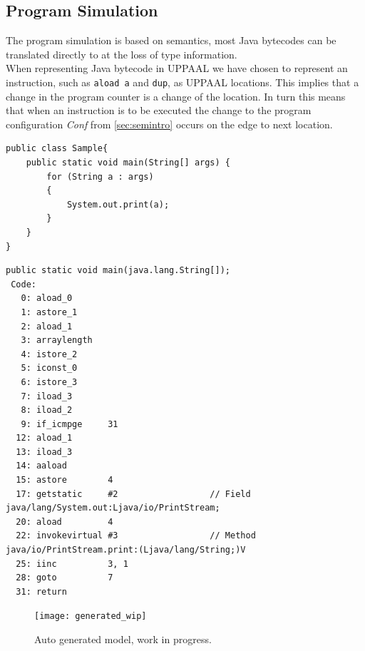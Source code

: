 \subsection{Program Simulation}
The program simulation is based on \jcl semantics, most Java bytecodes can be translated directly to \jcl at the loss of type information.\\
When representing Java bytecode in UPPAAL we have chosen to represent an instruction, such as \texttt{aload a} and \texttt{dup}, as UPPAAL locations. 
This implies that a change in the program counter is a change of the location. 
In turn this means that when an instruction is to be executed the change to the program configuration \textit{Conf} from  \cref{sec:semintro} occurs on the edge to next location.

\begin{lstlisting}[caption=Java code sample.]
public class Sample{
    public static void main(String[] args) {
        for (String a : args)         
        {
            System.out.print(a);
        }
    }
}
\end{lstlisting}

\begin{lstlisting}[caption=Bytecode sample.]
public static void main(java.lang.String[]);
 Code:
   0: aload_0       
   1: astore_1      
   2: aload_1       
   3: arraylength   
   4: istore_2      
   5: iconst_0      
   6: istore_3      
   7: iload_3       
   8: iload_2       
   9: if_icmpge     31
  12: aload_1       
  13: iload_3       
  14: aaload        
  15: astore        4
  17: getstatic     #2                  // Field java/lang/System.out:Ljava/io/PrintStream;
  20: aload         4
  22: invokevirtual #3                  // Method java/io/PrintStream.print:(Ljava/lang/String;)V
  25: iinc          3, 1
  28: goto          7
  31: return        

\end{lstlisting}

\begin{figure}[H]
\texttt{[image: generated\_wip]}
\caption{Auto generated model, work in progress.}
\label{fig:generated_wip}
\end{figure}

